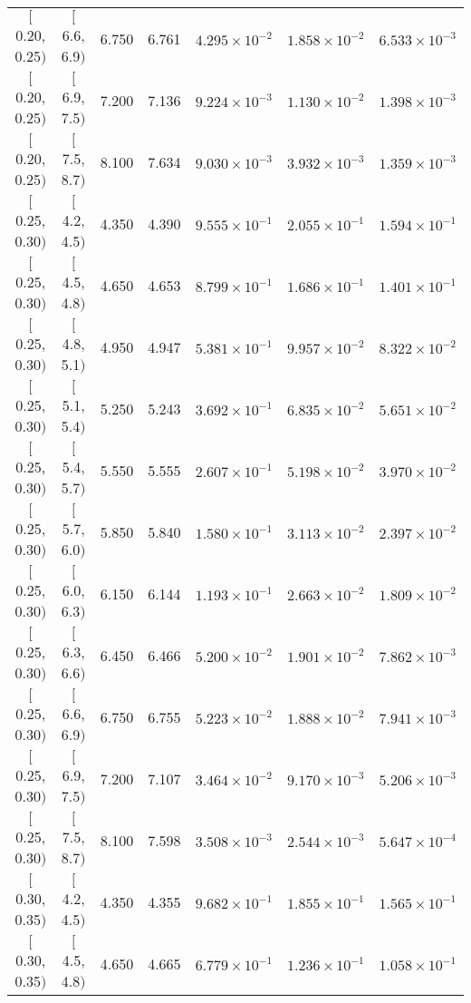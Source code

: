 \begin{longtable}{| c | c | c | c | c | c | c |}
$[$0.20, 0.25$)$ & $[$6.6, 6.9$)$ & 6.750 & 6.761 & $4.295 \times 10^{-2}$ & $1.858 \times 10^{-2}$ & $6.533 \times 10^{-3}$ \\
$[$0.20, 0.25$)$ & $[$6.9, 7.5$)$ & 7.200 & 7.136 & $9.224 \times 10^{-3}$ & $1.130 \times 10^{-2}$ & $1.398 \times 10^{-3}$ \\
$[$0.20, 0.25$)$ & $[$7.5, 8.7$)$ & 8.100 & 7.634 & $9.030 \times 10^{-3}$ & $3.932 \times 10^{-3}$ & $1.359 \times 10^{-3}$ \\
\hline
$[$0.25, 0.30$)$ & $[$4.2, 4.5$)$ & 4.350 & 4.390 & $9.555 \times 10^{-1}$ & $2.055 \times 10^{-1}$ & $1.594 \times 10^{-1}$ \\
$[$0.25, 0.30$)$ & $[$4.5, 4.8$)$ & 4.650 & 4.653 & $8.799 \times 10^{-1}$ & $1.686 \times 10^{-1}$ & $1.401 \times 10^{-1}$ \\
$[$0.25, 0.30$)$ & $[$4.8, 5.1$)$ & 4.950 & 4.947 & $5.381 \times 10^{-1}$ & $9.957 \times 10^{-2}$ & $8.322 \times 10^{-2}$ \\
$[$0.25, 0.30$)$ & $[$5.1, 5.4$)$ & 5.250 & 5.243 & $3.692 \times 10^{-1}$ & $6.835 \times 10^{-2}$ & $5.651 \times 10^{-2}$ \\
$[$0.25, 0.30$)$ & $[$5.4, 5.7$)$ & 5.550 & 5.555 & $2.607 \times 10^{-1}$ & $5.198 \times 10^{-2}$ & $3.970 \times 10^{-2}$ \\
$[$0.25, 0.30$)$ & $[$5.7, 6.0$)$ & 5.850 & 5.840 & $1.580 \times 10^{-1}$ & $3.113 \times 10^{-2}$ & $2.397 \times 10^{-2}$ \\
$[$0.25, 0.30$)$ & $[$6.0, 6.3$)$ & 6.150 & 6.144 & $1.193 \times 10^{-1}$ & $2.663 \times 10^{-2}$ & $1.809 \times 10^{-2}$ \\
$[$0.25, 0.30$)$ & $[$6.3, 6.6$)$ & 6.450 & 6.466 & $5.200 \times 10^{-2}$ & $1.901 \times 10^{-2}$ & $7.862 \times 10^{-3}$ \\
$[$0.25, 0.30$)$ & $[$6.6, 6.9$)$ & 6.750 & 6.755 & $5.223 \times 10^{-2}$ & $1.888 \times 10^{-2}$ & $7.941 \times 10^{-3}$ \\
$[$0.25, 0.30$)$ & $[$6.9, 7.5$)$ & 7.200 & 7.107 & $3.464 \times 10^{-2}$ & $9.170 \times 10^{-3}$ & $5.206 \times 10^{-3}$ \\
$[$0.25, 0.30$)$ & $[$7.5, 8.7$)$ & 8.100 & 7.598 & $3.508 \times 10^{-3}$ & $2.544 \times 10^{-3}$ & $5.647 \times 10^{-4}$ \\
\hline
$[$0.30, 0.35$)$ & $[$4.2, 4.5$)$ & 4.350 & 4.355 & $9.682 \times 10^{-1}$ & $1.855 \times 10^{-1}$ & $1.565 \times 10^{-1}$ \\
$[$0.30, 0.35$)$ & $[$4.5, 4.8$)$ & 4.650 & 4.665 & $6.779 \times 10^{-1}$ & $1.236 \times 10^{-1}$ & $1.058 \times 10^{-1}$ \\

\end{longtable}
